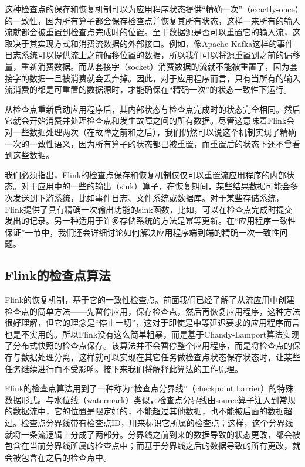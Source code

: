 \documentclass[oneside]{ctexbook}
\begin{document}
\sloppy
这种检查点的保存和恢复机制可以为应用程序状态提供“精确一次”（exactly-once）的一致性，因为所有算子都会保存检查点并恢复其所有状态，这样一来所有的输入流就都会被重置到检查点完成时的位置。至于数据源是否可以重置它的输入流，这取决于其实现方式和消费流数据的外部接口。例如，像Apache Kafka这样的事件日志系统可以提供流上之前偏移位置的数据，所以我们可以将源重置到之前的偏移量，重新消费数据。而从套接字（socket）消费数据的流就不能被重置了，因为套接字的数据一旦被消费就会丢弃掉。因此，对于应用程序而言，只有当所有的输入流消费的都是可重置的数据源时，才能确保在“精确一次”的状态一致性下运行。

从检查点重新启动应用程序后，其内部状态与检查点完成时的状态完全相同。然后它就会开始消费并处理检查点和发生故障之间的所有数据。尽管这意味着Flink会对一些数据处理两次（在故障之前和之后），我们仍然可以说这个机制实现了精确一次的一致性语义，因为所有算子的状态都已被重置，而重置后的状态下还不曾看到这些数据。

我们必须指出，Flink的检查点保存和恢复机制仅仅可以重置流应用程序的内部状态。对于应用中的一些的输出（sink）算子，在恢复期间，某些结果数据可能会多次发送到下游系统，比如事件日志、文件系统或数据库。对于某些存储系统，Flink提供了具有精确一次输出功​​能的sink函数，比如，可以在检查点完成时提交发出的记录。另一种适用于许多存储系统的方法是幂等更新。在“应用程序一致性保证”一节中，我们还会详细讨论如何解决应用程序端到端的精确一次一致性问题。

\subsection{Flink的检查点算法}

Flink的恢复机制，基于它的一致性检查点。前面我们已经了解了从流应用中创建检查点的简单方法——先暂停应用，保存检查点，然后再恢复应用程序，这种方法很好理解，但它的理念是“停止一切”，这对于即使是中等延迟要求的应用程序而言也是不实用的。所以Flink没有这么简单粗暴，而是基于Chandy-Lamport算法实现了分布式快照的检查点保存。该算法并不会暂停整个应用程序，而是将检查点的保存与数据处理分离，这样就可以实现在其它任务做检查点状态保存状态时，让某些任务继续进行而不受影响。接下来我们将解释此算法的工作原理。

Flink的检查点算法用到了一种称为“检查点分界线”（checkpoint barrier）的特殊数据形式。与水位线（watermark）类似，检查点分界线由source算子注入到常规的数据流中，它的位置是限定好的，不能超过其他数据，也不能被后面的数据超过。检查点分界线带有检查点ID，用来标识它所属的检查点；这样，这个分界线就将一条流逻辑上分成了两部分。分界线之前到来的数据导致的状态更改，都会被包含在当前分界线所属的检查点中；而基于分界线之后的数据导致的所有更改，就会被包含在之后的检查点中。
\end{document}
